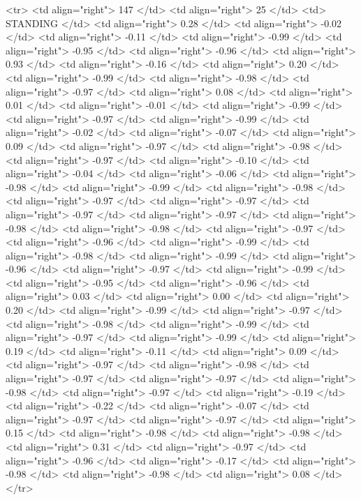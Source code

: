   <tr> <td align="right"> 147 </td> <td align="right">  25 </td> <td> STANDING </td> <td align="right"> 0.28 </td> <td align="right"> -0.02 </td> <td align="right"> -0.11 </td> <td align="right"> -0.99 </td> <td align="right"> -0.95 </td> <td align="right"> -0.96 </td> <td align="right"> 0.93 </td> <td align="right"> -0.16 </td> <td align="right"> 0.20 </td> <td align="right"> -0.99 </td> <td align="right"> -0.98 </td> <td align="right"> -0.97 </td> <td align="right"> 0.08 </td> <td align="right"> 0.01 </td> <td align="right"> -0.01 </td> <td align="right"> -0.99 </td> <td align="right"> -0.97 </td> <td align="right"> -0.99 </td> <td align="right"> -0.02 </td> <td align="right"> -0.07 </td> <td align="right"> 0.09 </td> <td align="right"> -0.97 </td> <td align="right"> -0.98 </td> <td align="right"> -0.97 </td> <td align="right"> -0.10 </td> <td align="right"> -0.04 </td> <td align="right"> -0.06 </td> <td align="right"> -0.98 </td> <td align="right"> -0.99 </td> <td align="right"> -0.98 </td> <td align="right"> -0.97 </td> <td align="right"> -0.97 </td> <td align="right"> -0.97 </td> <td align="right"> -0.97 </td> <td align="right"> -0.98 </td> <td align="right"> -0.98 </td> <td align="right"> -0.97 </td> <td align="right"> -0.96 </td> <td align="right"> -0.99 </td> <td align="right"> -0.98 </td> <td align="right"> -0.99 </td> <td align="right"> -0.96 </td> <td align="right"> -0.97 </td> <td align="right"> -0.99 </td> <td align="right"> -0.95 </td> <td align="right"> -0.96 </td> <td align="right"> 0.03 </td> <td align="right"> 0.00 </td> <td align="right"> 0.20 </td> <td align="right"> -0.99 </td> <td align="right"> -0.97 </td> <td align="right"> -0.98 </td> <td align="right"> -0.99 </td> <td align="right"> -0.97 </td> <td align="right"> -0.99 </td> <td align="right"> 0.19 </td> <td align="right"> -0.11 </td> <td align="right"> 0.09 </td> <td align="right"> -0.97 </td> <td align="right"> -0.98 </td> <td align="right"> -0.97 </td> <td align="right"> -0.97 </td> <td align="right"> -0.98 </td> <td align="right"> -0.97 </td> <td align="right"> -0.19 </td> <td align="right"> -0.22 </td> <td align="right"> -0.07 </td> <td align="right"> -0.97 </td> <td align="right"> -0.97 </td> <td align="right"> 0.15 </td> <td align="right"> -0.98 </td> <td align="right"> -0.98 </td> <td align="right"> 0.31 </td> <td align="right"> -0.97 </td> <td align="right"> -0.96 </td> <td align="right"> -0.17 </td> <td align="right"> -0.98 </td> <td align="right"> -0.98 </td> <td align="right"> 0.08 </td> </tr>
